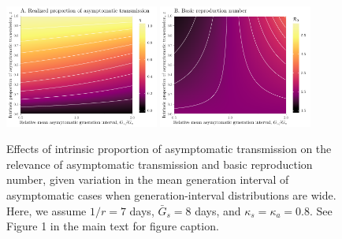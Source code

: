 \begin{figure}[!ht]
\begin{center}
\includegraphics[width=0.45\textwidth]{figheatmap_08.pdf}
\mbox{\hspace{0.05\textwidth}}
\includegraphics[width=0.45\textwidth]{figheatmap_R0_08.pdf}
\caption{Effects of intrinsic proportion of asymptomatic transmission on the relevance of asymptomatic transmission and basic reproduction number, given variation in
the mean generation interval of asymptomatic cases when generation-interval distributions are wide. 
Here, we assume $1/r=7$ days, $\bar G_s=8$ days, and $\kappa_s=\kappa_a=0.8$.
See Figure 1 in the main text for figure caption.
}
\end{center}
\end{figure}

\pagebreak

